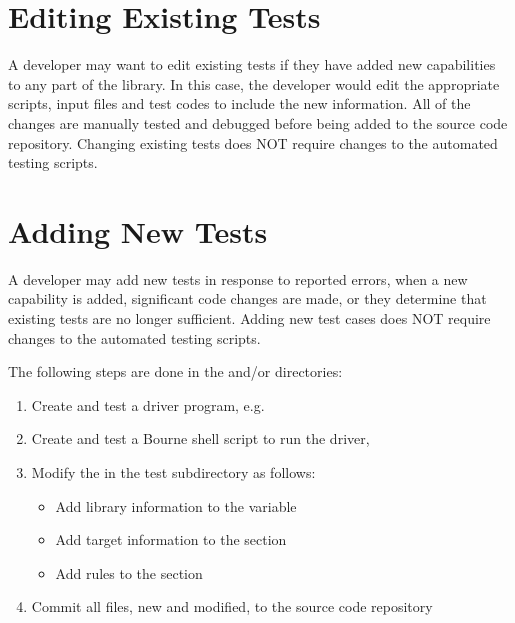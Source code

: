 \section{Editing Existing Tests}
\label{Editing Existing Tests}

A developer may want to edit existing tests if they have added new capabilities to any
part of the library.  In this case, the developer would edit the appropriate scripts,
input files and test codes to include the new information.  All of the changes are 
manually tested and debugged before being added to the source code repository. Changing
existing tests does NOT require changes to the automated testing scripts.

\section{Adding New Tests}
\label{Adding New Tests}

A developer may add new tests in response to reported errors, when a new capability
is added, significant code changes are made, or they determine that existing tests 
are no longer sufficient.  Adding new test cases does NOT require changes to the 
automated testing scripts.

The following steps are done in the  and/or  directories:
\begin{enumerate}
\item Create and test a driver program, e.g. 
\item Create and test a Bourne shell script to run the driver, 
\item Modify the  in the test subdirectory as follows:
  \begin{itemize}
  \item Add library information to the  variable
  \item Add target information to the  section
  \item Add rules to the  section
  \end{itemize}
\item Commit all files, new and modified, to the source code repository
\end{enumerate}

